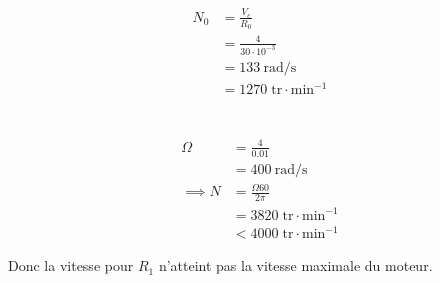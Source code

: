 \documentclass{article}
\newcommand{\rpm}{\text{tr}\cdot\text{min}^{-1}}
\begin{document}
\section{}

\begin{equation*}
  \begin{split}
    N_0 &= \frac{V_c}{R_0} \\
        &= \frac{4}{30\cdot10^{-3}} \\
        &= \SI{133}{\radian\per\second} \\
        &= 1270\;\rpm
  \end{split}
\end{equation*}

\section{}

\begin{equation*}
  \begin{split}
    \Omega &= \frac{4}{0.01} \\
    &= \SI{400}{\radian\per\second} \\
    \implies N &= \frac{\Omega 60}{2\pi} \\
    &= 3820\;\rpm \\
    &< 4000\;\rpm
  \end{split}
\end{equation*}

Donc la vitesse pour $R_1$ n'atteint pas la vitesse maximale du moteur.
\end{document}
